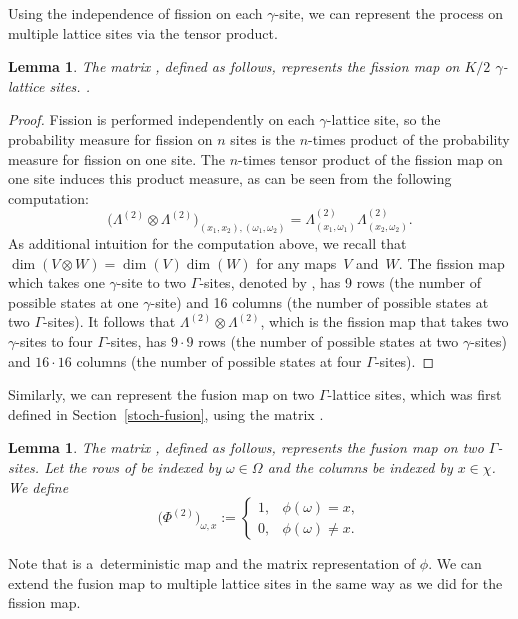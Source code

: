 \documentclass[pdftex]{sigma}
\numberwithin{equation}{section}
\newtheorem{Lemma}[Theorem]{Lemma}
\theoremstyle{definition}
\begin{document}
Using the independence of fission on each $\gamma$-site, we can represent the process on multiple lattice sites via the tensor product.
\begin{Lemma} The matrix , defined as follows, represents the fission map on $K/2$ $\gamma$-lattice sites.
.
\end{Lemma}
\begin{proof}
 Fission is performed independently on each $\gamma$-lattice site, so the probability measure for fission on $n$ sites is the $n$-times product of the probability measure for fission on one site. The $n$-times tensor product of the fission map on one site induces this product measure, as can be seen from the following computation:
\[
\bigl(\Lambda^{(2)} \otimes \Lambda^{(2)}\bigr)_{(x_1,x_2),(\omega_1,\omega_2)} = \Lambda^{(2)}_{(x_1,\omega_1)}\Lambda^{(2)}_{(x_2,\omega_2)}.
\]
As additional intuition for the computation above, we recall that $\dim(V \otimes W) = \dim(V) \dim(W)$ for any maps~$V$ and~$W$. The fission map which takes one $\gamma$-site to two $\Gamma$-sites, denoted by , has 9 rows (the number of possible states at one $\gamma$-site) and 16 columns (the number of possible states at two $\Gamma$-sites). It follows that
$\Lambda^{(2)} \otimes \Lambda^{(2)}$, which is the fission map that takes two $\gamma$-sites to four $\Gamma$-sites, has $9\cdot 9$ rows (the number of possible states at two $\gamma$-sites) and $16 \cdot 16$ columns (the number of possible states at four $\Gamma$-sites).
\end{proof}

Similarly, we can represent the fusion map on two $\Gamma$-lattice sites, which was first defined in Section~\ref{stoch-fusion}, using the matrix .

\begin{Lemma}\label{PhiTwo}
 The matrix , defined as follows, represents the fusion map on two $\Gamma$-sites.
 Let the rows of  be indexed by $\omega \in \Omega$ and the columns be indexed by $x \in \chi$. We define
 \[
 \bigl(\Phi^{(2)}\bigr)_{\omega, x} :=
 \begin{cases}
 1 ,& \phi(\omega) = x, \\
 0, & \phi(\omega) \neq x.
 \end{cases}
 \]
\end{Lemma}

Note that  is a~deterministic map and the matrix representation of $\phi$.
We can extend the fusion map to multiple lattice sites in the same way as we did for the fission map.
\end{document}
